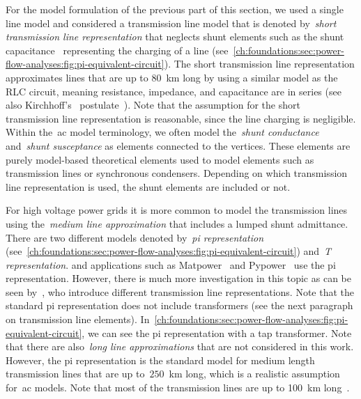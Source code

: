 For the model formulation of the previous part of this section, we used a single
line model and considered a transmission line model that is denoted
by~\emph{short transmission line representation} that neglects shunt elements
such as the shunt capacitance~ representing
the charging of a line
(see~\cref{ch:foundations:sec:power-flow-analyses:fig:pi-equivalent-circuit}).
The short transmission line representation approximates lines that are up to
80~\si{km} long by using a similar model as the RLC circuit, meaning resistance,
impedance, and capacitance are in series (see also Kirchhoff's~
postulate~\parencite[p.127]{Ses61}). Note that the assumption for the short
transmission line representation is reasonable, since the line charging is
negligible. Within the~\gls{ac} model terminology, we often model
the~\emph{shunt conductance} and~\emph{shunt susceptance} as elements connected
to the vertices. These elements are purely model-based theoretical elements used
to model elements such as transmission lines or synchronous condensers.
Depending on which transmission line representation is used, the shunt elements
are included or not.

For high voltage power grids it is more common to model the transmission lines
using the~\emph{medium line approximation} that includes a lumped shunt
admittance. There are two different models denoted by~\emph{pi representation}
% 
(see~\cref{ch:foundations:sec:power-flow-analyses:fig:pi-equivalent-circuit}) 
% 
and~\emph{T representation}. \textcite[p.75]{wood1996power} and applications
such as Matpower~\parencite[pp.16ff.]{Zimmerman2011} and
Pypower~\parencite{online:pypower} use the pi representation. However, there is
much more investigation in this topic as can be seen by~\textcite{CANO201771},
who introduce different transmission line representations. Note that the
standard pi representation does not include transformers (see the next
paragraph on transmission line elements).
% 
In~\cref{ch:foundations:sec:power-flow-analyses:fig:pi-equivalent-circuit},
% 
we can see the pi representation with a tap transformer. Note that there are
also~\emph{long line approximations} that are not considered in this work.
However, the pi representation is the standard model for medium length
transmission lines that are up to~$250$~\si{\km} long, which is a realistic
assumption for~\gls{ac} models. Note that most of the transmission lines are up
to 100~\si{\km} long~\parencite[p.112]{Nov12}.


